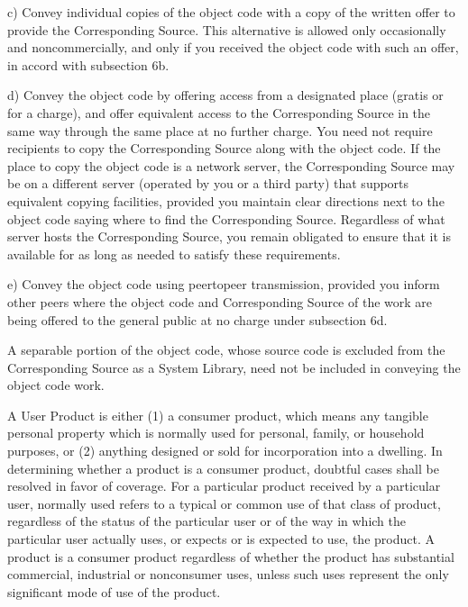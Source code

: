 \documentclass[letterpaper,10pt,english]{sphinxmanual}
\begin{document}
\begin{sphinxVerbatim}[commandchars=\\\{\}]
    c) Convey individual copies of the object code with a copy of the
    written offer to provide the Corresponding Source.  This
    alternative is allowed only occasionally and noncommercially, and
    only if you received the object code with such an offer, in accord
    with subsection 6b.

    d) Convey the object code by offering access from a designated
    place (gratis or for a charge), and offer equivalent access to the
    Corresponding Source in the same way through the same place at no
    further charge.  You need not require recipients to copy the
    Corresponding Source along with the object code.  If the place to
    copy the object code is a network server, the Corresponding Source
    may be on a different server (operated by you or a third party)
    that supports equivalent copying facilities, provided you maintain
    clear directions next to the object code saying where to find the
    Corresponding Source.  Regardless of what server hosts the
    Corresponding Source, you remain obligated to ensure that it is
    available for as long as needed to satisfy these requirements.

    e) Convey the object code using peer\PYGZhy{}to\PYGZhy{}peer transmission, provided
    you inform other peers where the object code and Corresponding
    Source of the work are being offered to the general public at no
    charge under subsection 6d.

  A separable portion of the object code, whose source code is excluded
from the Corresponding Source as a System Library, need not be
included in conveying the object code work.

  A \PYGZdq{}User Product\PYGZdq{} is either (1) a \PYGZdq{}consumer product\PYGZdq{}, which means any
tangible personal property which is normally used for personal, family,
or household purposes, or (2) anything designed or sold for incorporation
into a dwelling.  In determining whether a product is a consumer product,
doubtful cases shall be resolved in favor of coverage.  For a particular
product received by a particular user, \PYGZdq{}normally used\PYGZdq{} refers to a
typical or common use of that class of product, regardless of the status
of the particular user or of the way in which the particular user
actually uses, or expects or is expected to use, the product.  A product
is a consumer product regardless of whether the product has substantial
commercial, industrial or non\PYGZhy{}consumer uses, unless such uses represent
the only significant mode of use of the product.


\end{sphinxVerbatim}
\end{document}

